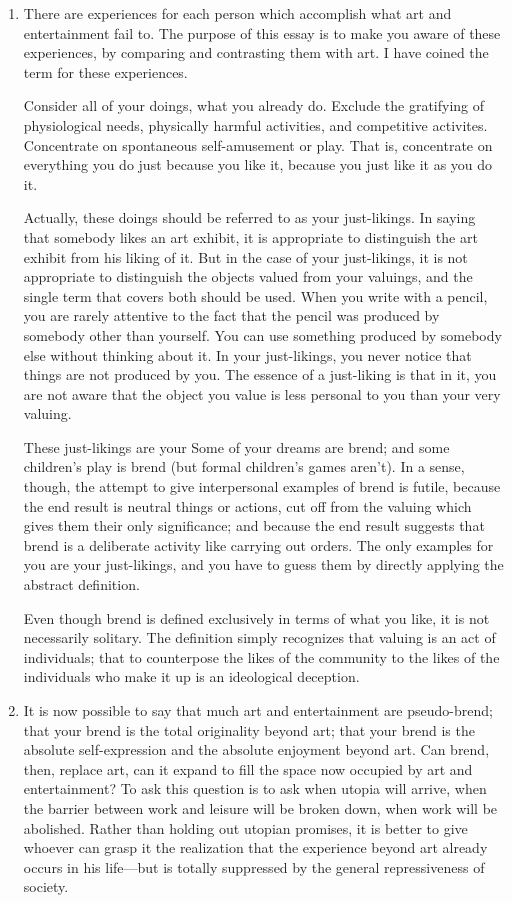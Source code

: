 \begin{enumerate}[label=\textbf{\arabic*.}, wide, itemsep=1em]
\item There are experiences for each person which accomplish what art and 
entertainment fail to. The purpose of this essay is to make you aware of 
these experiences, by comparing and contrasting them with art. I have 
coined the term  for these experiences. 

Consider all of your doings, what you already do. Exclude the gratifying of 
physiological needs, physically harmful activities, and competitive activites. 
Concentrate on spontaneous self-amusement or play. That is, concentrate on 
everything you do just because you like it, because you just like it as you do 
it. 

Actually, these doings should be referred to as your just-likings. In saying 
that somebody likes an art exhibit, it is appropriate to distinguish the art 
exhibit from his liking of it. But in the case of your just-likings, it is not 
appropriate to distinguish the objects valued from your valuings, and the 
single term that covers both should be used. When you write with a pencil, 
you are rarely attentive to the fact that the pencil was produced by 
somebody other than yourself. You can use something produced by 
somebody else without thinking about it. In your just-likings, you never 
notice that things are not produced by you. The essence of a just-liking is 
that in it, you are not aware that the object you value is less personal to you 
than your very valuing. 

These just-likings are your  Some of your dreams are brend; and 
some children's play is brend (but formal children's games aren't). In a sense, 
though, the attempt to give interpersonal examples of brend is futile, 
because the end result is neutral things or actions, cut off from the valuing 
which gives them their only significance; and because the end result suggests 
that brend is a deliberate activity like carrying out orders. The only examples 
for you are your just-likings, and you have to guess them by directly 
applying the abstract definition. 

Even though brend is defined exclusively in terms of what you like, it is not 
necessarily solitary. The definition simply recognizes that valuing is an act of 
individuals; that to counterpose the likes of the community to the likes of 
the individuals who make it up is an ideological deception. 

\item It is now possible to say that much art and entertainment are 
pseudo-brend; that your brend is the total originality beyond art; that your 
brend is the absolute self-expression and the absolute enjoyment beyond art. 
Can brend, then, replace art, can it expand to fill the space now occupied by 
art and entertainment? To ask this question is to ask when utopia will 
arrive, when the barrier between work and leisure will be broken down, 
when work will be abolished. Rather than holding out utopian promises, it is 
better to give whoever can grasp it the realization that the experience 
beyond art already occurs in his life---but is totally suppressed by the general 
repressiveness of society. 
\end{enumerate}

